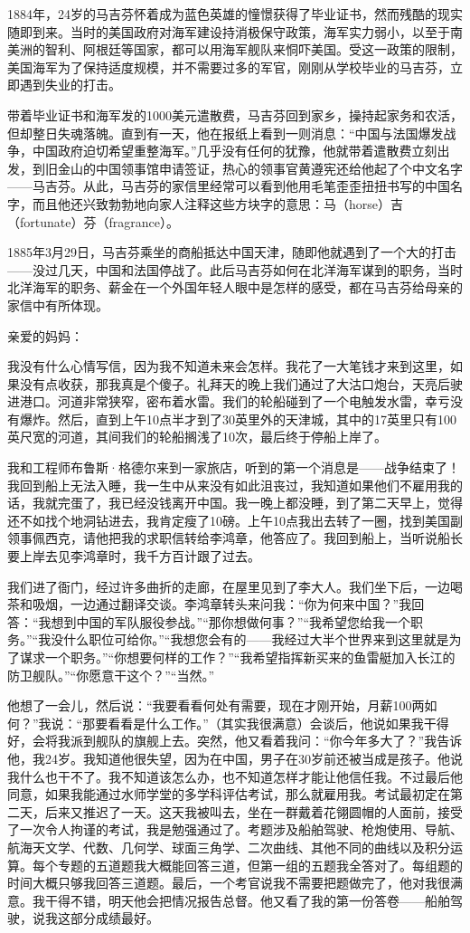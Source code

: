 \documentclass[12pt,UTF8]{ctexbook}
\begin{document}
1884年，24岁的马吉芬怀着成为蓝色英雄的憧憬获得了毕业证书，然而残酷的现实随即到来。当时的美国政府对海军建设持消极保守政策，海军实力弱小，以至于南美洲的智利、阿根廷等国家，都可以用海军舰队来恫吓美国。受这一政策的限制，美国海军为了保持适度规模，并不需要过多的军官，刚刚从学校毕业的马吉芬，立即遇到失业的打击。

带着毕业证书和海军发的1000美元遣散费，马吉芬回到家乡，操持起家务和农活，但却整日失魂落魄。直到有一天，他在报纸上看到一则消息：“中国与法国爆发战争，中国政府迫切希望重整海军。”几乎没有任何的犹豫，他就带着遣散费立刻出发，到旧金山的中国领事馆申请签证，热心的领事官黄遵宪还给他起了个中文名字——马吉芬。从此，马吉芬的家信里经常可以看到他用毛笔歪歪扭扭书写的中国名字，而且他还兴致勃勃地向家人注释这些方块字的意思：马（horse）吉（fortunate）芬（fragrance）。

1885年3月29日，马吉芬乘坐的商船抵达中国天津，随即他就遇到了一个大的打击——没过几天，中国和法国停战了。此后马吉芬如何在北洋海军谋到的职务，当时北洋海军的职务、薪金在一个外国年轻人眼中是怎样的感受，都在马吉芬给母亲的家信中有所体现。

亲爱的妈妈：

我没有什么心情写信，因为我不知道未来会怎样。我花了一大笔钱才来到这里，如果没有点收获，那我真是个傻子。礼拜天的晚上我们通过了大沽口炮台，天亮后驶进港口。河道非常狭窄，密布着水雷。我们的轮船碰到了一个电触发水雷，幸亏没有爆炸。然后，直到上午10点半才到了30英里外的天津城，其中的17英里只有100英尺宽的河道，其间我们的轮船搁浅了10次，最后终于停船上岸了。

我和工程师布鲁斯·格德尔来到一家旅店，听到的第一个消息是——战争结束了！我回到船上无法入睡，我一生中从来没有如此沮丧过，我知道如果他们不雇用我的话，我就完蛋了，我已经没钱离开中国。我一晚上都没睡，到了第二天早上，觉得还不如找个地洞钻进去，我肯定瘦了10磅。上午10点我出去转了一圈，找到美国副领事佩西克，请他把我的求职信转给李鸿章，他答应了。我回到船上，当听说船长要上岸去见李鸿章时，我千方百计跟了过去。

我们进了衙门，经过许多曲折的走廊，在屋里见到了李大人。我们坐下后，一边喝茶和吸烟，一边通过翻译交谈。李鸿章转头来问我：“你为何来中国？”我回答：“我想到中国的军队服役参战。”“那你想做何事？”“我希望您给我一个职务。”“我没什么职位可给你。”“我想您会有的——我经过大半个世界来到这里就是为了谋求一个职务。”“你想要何样的工作？”“我希望指挥新买来的鱼雷艇加入长江的防卫舰队。”“你愿意干这个？”“当然。”

他想了一会儿，然后说：“我要看看何处有需要，现在才刚开始，月薪100两如何？”我说：“那要看看是什么工作。”（其实我很满意）会谈后，他说如果我干得好，会将我派到舰队的旗舰上去。突然，他又看着我问：“你今年多大了？”我告诉他，我24岁。我知道他很失望，因为在中国，男子在30岁前还被当成是孩子。他说我什么也干不了。我不知道该怎么办，也不知道怎样才能让他信任我。不过最后他同意，如果我能通过水师学堂的多学科评估考试，那么就雇用我。考试最初定在第二天，后来又推迟了一天。这天我被叫去，坐在一群戴着花翎圆帽的人面前，接受了一次令人拘谨的考试，我是勉强通过了。考题涉及船舶驾驶、枪炮使用、导航、航海天文学、代数、几何学、球面三角学、二次曲线、其他不同的曲线以及积分运算。每个专题的五道题我大概能回答三道，但第一组的五题我全答对了。每组题的时间大概只够我回答三道题。最后，一个考官说我不需要把题做完了，他对我很满意。我干得不错，明天他会把情况报告总督。他又看了我的第一份答卷——船舶驾驶，说我这部分成绩最好。
\end{document}
